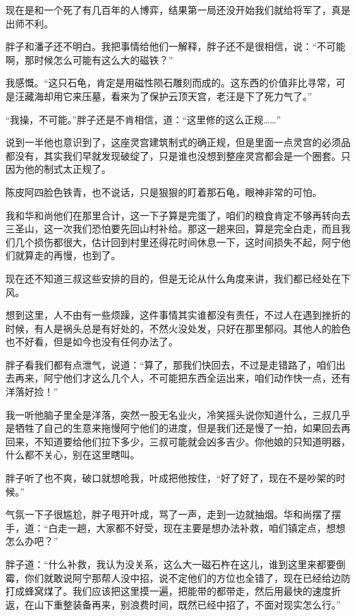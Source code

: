 现在是和一个死了有几百年的人博弈，结果第一局还没开始我们就给将军了，真是出师不利。

胖子和潘子还不明白。我把事情给他们一解释，胖子还不是很相信，说：“不可能啊，那时候怎么可能有这么大的磁铁？”

我感慨。“这只石龟，肯定是用磁性陨石雕刻而成的。这东西的价值非比寻常，可是汪藏海却用它来压墓，看来为了保护云顶天宫，老汪是下了死力气了。”

“我操，不可能。”胖子还是不肯相信，道：“这里修的这么正规……”

说到一半他也意识到了，这座灵宫建筑制式的确正规，但是里面一点灵宫的必须品都没有，其实我们早就发现破绽了，只是谁也没想到整座灵宫都会是一个圈套。只因为他的制式太正规了。

陈皮阿四脸色铁青，也不说话，只是狠狠的盯着那石龟，眼神非常的可怕。

我和华和尚他们在那里合计，这一下子算是完蛋了，咱们的粮食肯定不够再转向去三圣山，这一次我们恐怕要先回山村补给。那这一趟来回，算是完全白走，而且我们几个损伤都很大，估计回到村里还得花时间休息一下，这时间损失不起，阿宁他们就算走的再慢，也到了。

现在还不知道三叔这些安排的目的，但是无论从什么角度来讲，我们都已经处在下风。

想到这里，人不由有一些烦躁，这件事情其实谁都没有责任，不过人在遇到挫折的时候，有人是祸头总是有好处的，不然火没处发，只好在那里郁闷。其他人的脸色也不好看，但是如今也没有任何办法了。

胖子看我们都有点泄气，说道：“算了，那我们快回去，不过是走错路了，咱们出去再来，阿宁他们才这么几个人，不可能把东西全运出来，咱们动作快一点，还有洋落好捡！”

我一听他脑子里全是洋落，突然一股无名业火，冷笑摇头说你知道什么，三叔几乎是牺牲了自己的生意来拖慢阿宁他们的进度，但是我们还是慢了一拍，如果回去再回来，不知道要给他们拉下多少，三叔可能就会凶多吉少。你他娘的只知道明器，什么都不关心，别在这里瞎叫。

胖子听了也不爽，破口就想呛我，叶成把他按住，“好了好了，现在不是吵架的时候。”

气氛一下子很尴尬，胖子甩开叶成，骂了一声，走到一边就抽烟。华和尚摆了摆手，道：“白走一趟，大家都不好受，现在主要是想办法补救，咱们镇定点，想想怎么办吧？”

胖子道：“什么补救，我认为没关系，这么大一磁石杵在这儿，谁到这里来都要倒霉，你们就敢说阿宁那帮人没中招，说不定他们的方位也全错了，现在已经给边防打成蜂窝煤了。我们应该把这里摸一遍，把能带的都带走，然后用最快的速度折返，在山下重整装备再来，别浪费时间，既然已经中招了，不面对现实怎么行。”

